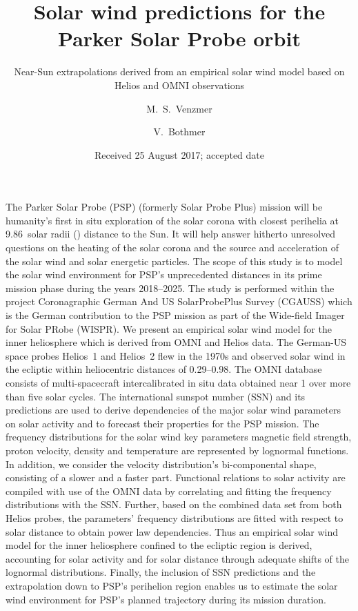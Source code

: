 
\title{Solar wind predictions for the Parker Solar Probe orbit}
\subtitle{Near-Sun extrapolations derived from an empirical solar wind model based on Helios and OMNI observations}

\author{M.~S.~Venzmer
\and V.~Bothmer}


\date{Received 25 August 2017; accepted date}

\abstract
{The Parker Solar Probe (PSP) (formerly Solar Probe Plus) mission will be humanity’s first in situ exploration of the solar corona with closest perihelia at \num{9.86}~solar radii (\si{\Rs}) distance to the Sun. It will help answer hitherto unresolved questions on the heating of the solar corona and the source and acceleration of the solar wind and solar energetic particles. The scope of this study is to model the solar wind environment for PSP’s unprecedented distances in its prime mission phase during the years \numrange{2018}{2025}. The study is performed within the project Coronagraphic German And US SolarProbePlus Survey (CGAUSS) which is the German contribution to the PSP mission as part of the Wide-field Imager for Solar PRobe (WISPR).}	%
{We present an empirical solar wind model for the inner heliosphere which is derived from OMNI and Helios data. The German-US space probes Helios~1 and Helios~2 flew in the 1970s and observed solar wind in the ecliptic within heliocentric distances of \SIrange{0.29}{0.98}{\au}. The OMNI database consists of multi-spacecraft intercalibrated in situ data obtained near \SI{1}{\au} over more than five solar cycles. The international sunspot number (SSN) and its predictions are used to derive dependencies of the major solar wind parameters on solar activity and to forecast their properties for the PSP mission.}	%
{The frequency distributions for the solar wind key parameters magnetic field strength, proton velocity, density and temperature are represented by lognormal functions. In addition, we consider the velocity distribution’s bi-componental shape, consisting of a slower and a faster part. Functional relations to solar activity are compiled with use of the OMNI data by correlating and fitting the frequency distributions with the SSN. Further, based on the combined data set from both Helios probes, the parameters’ frequency distributions are fitted with respect to solar distance to obtain power law dependencies. Thus an empirical solar wind model for the inner heliosphere confined to the ecliptic region is derived, accounting for solar activity and for solar distance through adequate shifts of the lognormal distributions. Finally, the inclusion of SSN predictions and the extrapolation down to PSP’s perihelion region enables us to estimate the solar wind environment for PSP’s planned trajectory during its mission duration.}	%
